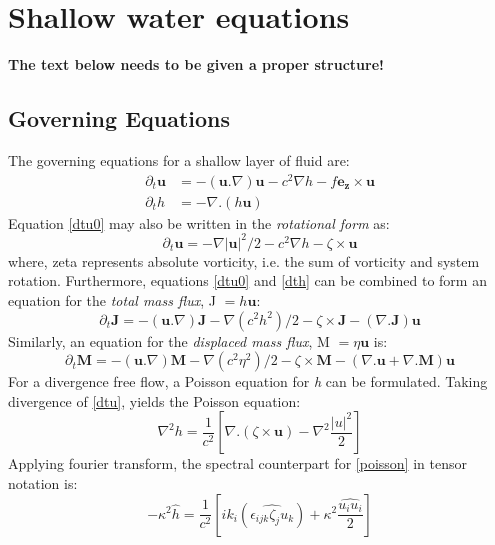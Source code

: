 \section{Shallow water equations}

\textbf{The text below needs to be given a proper structure!}

\subsection{Governing Equations}

The governing equations for a shallow layer of fluid are:
\begin{align}
    \label{dtu0} \partial_t \mathbf u & = - (\mathbf{u}.\nabla) \mathbf{u} - c^2 \nabla h - f\mathbf{e_z} \times \mathbf u \\
    \label{dth} \partial_t h         & = - \nabla. (h \mathbf u)
\end{align}
Equation \eqref{dtu0} may also be written in the \textit{rotational form} as:
\begin{equation}
    \label{dtu}
    \partial_t \mathbf u
    = - \nabla |\mathbf u|^2/2 - c^2 \nabla h - \zeta \times \mathbf u
\end{equation}
where, \gls{zeta}
represents absolute vorticity, i.e. the sum of vorticity and system rotation.
Furthermore, equations \eqref{dtu0} and \eqref{dth} can be combined to form an
equation for the \textit{total mass flux}, \gls{J} $= h\mathbf{u}$:
\begin{equation}
    \label{dtJ}
    \partial_t \mathbf J = -(\mathbf{u}.\nabla)\mathbf{J} - \nabla(c^2h^2)/2 -
    \zeta \times \mathbf J - (\nabla. \mathbf J)\mathbf u
\end{equation}
Similarly, an equation for the \textit{displaced mass flux}, \gls{M} $ =
    \eta\mathbf{u}$ is:
\begin{equation}
    \label{dtM}
    \partial_t \mathbf M = -(\mathbf{u}.\nabla)\mathbf{M} - \nabla(c^2\eta^2)/2 -
    \zeta \times \mathbf M - (\nabla.\mathbf{u} + \nabla.\mathbf{M})\mathbf u
\end{equation}
For a divergence free flow, a Poisson equation for \emph{h} can be formulated.
Taking divergence of \eqref{dtu},
yields the Poisson equation:
\begin{equation}
    \label{poisson}
    \nabla^2 h = \frac{1}{c^2} \left[ \nabla.(\zeta \times \mathbf u )
        - \nabla^2 \frac{|u|^2}{2} \right]
\end{equation}
Applying fourier transform, the spectral counterpart for \eqref{poisson} in
tensor notation is:
\begin{equation}
    \label{poisson_fft}
    -\kappa^2 \hat{h} = \frac{1}{c^2} \left[ ik_i (\widehat{\epsilon_{ijk} \zeta_j
            u_k})
        + \kappa^2 \frac{\widehat{u_i u_i}}{2} \right]
\end{equation}

